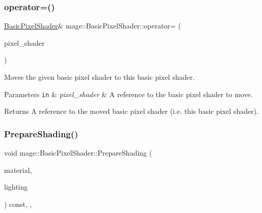 \subsubsection{\texorpdfstring{operator=()}{operator=()}\hspace{0.1cm}{\footnotesize\ttfamily [2/2]}}
{\footnotesize\ttfamily \hyperlink{classmage_1_1_basic_pixel_shader}{Basic\+Pixel\+Shader}\& mage\+::\+Basic\+Pixel\+Shader\+::operator= (\begin{DoxyParamCaption}\item[{\hyperlink{classmage_1_1_basic_pixel_shader}{Basic\+Pixel\+Shader} \&\&}]{pixel\+\_\+shader }\end{DoxyParamCaption})\hspace{0.3cm}{\ttfamily [delete]}}

Moves the given basic pixel shader to this basic pixel shader.


\begin{DoxyParams}[1]{Parameters}
\mbox{\tt in}  & {\em pixel\+\_\+shader} & A reference to the basic pixel shader to move. \\
\hline
\end{DoxyParams}
\begin{DoxyReturn}{Returns}
A reference to the moved basic pixel shader (i.\+e. this basic pixel shader). 
\end{DoxyReturn}
\hypertarget{classmage_1_1_basic_pixel_shader_a67ce881c6c02b2ceabca29cd3b6a4a89}{}\label{classmage_1_1_basic_pixel_shader_a67ce881c6c02b2ceabca29cd3b6a4a89} 
\subsubsection{\texorpdfstring{Prepare\+Shading()}{PrepareShading()}}
{\footnotesize\ttfamily void mage\+::\+Basic\+Pixel\+Shader\+::\+Prepare\+Shading (\begin{DoxyParamCaption}\item[{const \hyperlink{structmage_1_1_material}{Material} \&}]{material,  }\item[{const \hyperlink{structmage_1_1_lighting}{Lighting} \&}]{lighting }\end{DoxyParamCaption}) const\hspace{0.3cm}{\ttfamily [final]}, {\ttfamily [override]}, {\ttfamily [virtual]}}

